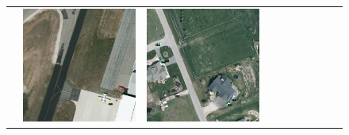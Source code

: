 \begin{figure}[h!]
\begin{tabularx}{\textwidth}{c|*{9}{X}}
    &  \includegraphics[trim={650pt 120pt 170pt 720pt},clip,width=\linewidth]{images/015Results/01abb_vs_obb/comp_images/obb/487.png}
    & \includegraphics[trim={230pt 200pt 680pt 725pt},clip,width=\linewidth]{images/015Results/01abb_vs_obb/comp_images/obb/509.png}

\end{tabularx}
\end{figure}
